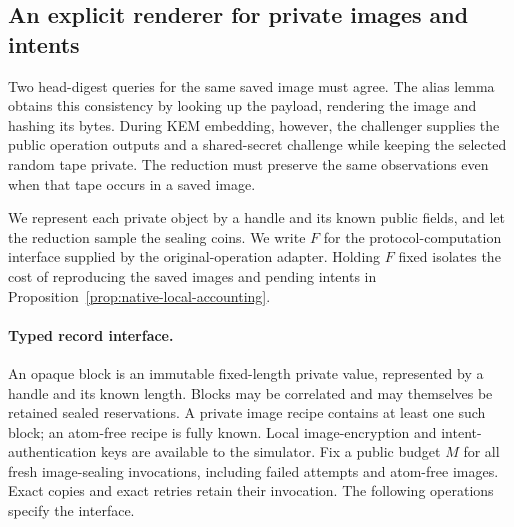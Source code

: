 \subsection{An explicit renderer for private images and intents}
\label{sec:opaque-rendering}

Two head-digest queries for the same saved image must agree. The alias
lemma obtains this consistency by looking up the payload, rendering the
image and hashing its bytes. During KEM embedding, however, the challenger
supplies the public operation outputs and a shared-secret challenge while
keeping the selected random tape private. The reduction must preserve
the same observations even when that tape occurs in a saved image.

We represent each private object by a handle and its known public fields,
and let the reduction sample the sealing coins. We write $F$ for the
protocol-computation interface supplied by the original-operation adapter.
Holding $F$ fixed isolates the cost of reproducing the saved
images and pending intents in
Proposition~\ref{prop:native-local-accounting}.

\paragraph{Typed record interface.}
An opaque block is an immutable fixed-length private value, represented by a
handle and its known length. Blocks may be correlated and may themselves be
retained sealed reservations. A private image recipe contains at least one
such block; an atom-free recipe is fully known. Local image-encryption and
intent-authentication keys are available to the simulator. Fix a public
budget $M$ for all fresh image-sealing invocations, including failed attempts
and atom-free images. Exact copies and exact retries retain their invocation.
The following operations specify the interface.

